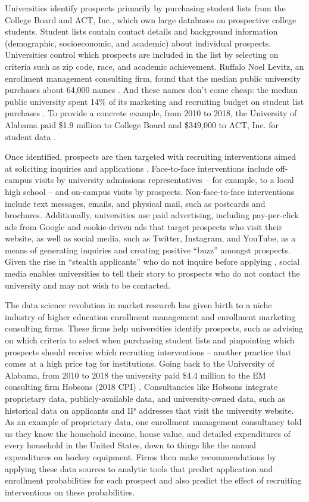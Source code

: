 \documentclass{article}
\begin{document}
Universities identify prospects primarily by purchasing student lists from the College Board and ACT, Inc., which own large databases on prospective college students. Student lists contain contact details and background information (demographic, socioeconomic, and academic) about individual prospects. Universities control which prospects are included in the list by selecting on criteria such as zip code, race, and academic achievement. Ruffalo Noel Levitz, an enrollment management consulting firm, found that the median public university purchases about 64,000 names \citep{RN4314}. And these names don't come cheap: the median public university spent 14\% of its marketing and recruiting budget on student list purchases \citep{RN4402}. To provide a concrete example, from 2010 to 2018, the University of Alabama paid \$1.9 million to College Board and \$349,000 to ACT, Inc. for student data \citep{RN4035}.

Once identified, prospects are then targeted with recruiting interventions aimed at soliciting inquiries and applications \citep{RN4323, RN4402}. Face-to-face interventions include off-campus visits by university admissions representatives -- for example, to a local high school -- and on-campus visits by prospects. Non-face-to-face interventions include text messages, emails, and physical mail, such as postcards and brochures. Additionally, universities use paid advertising, including pay-per-click ads from Google and cookie-driven ads that target prospects who visit their website, as well as social media, such as Twitter, Instagram, and YouTube, as a means of generating inquiries and creating positive ``buzz'' amongst prospects. Given the rise in ``stealth applicants'' who do not inquire before applying \citep{RN4411}, social media enables universities to tell their story to prospects who do not contact the university and may not wish to be contacted.

The data science revolution in market research has given birth to a niche industry of higher education enrollment management and enrollment marketing consulting firms. These firms help universities identify prospects, such as advising on which criteria to select when purchasing student lists and pinpointing which prospects should receive which recruiting interventions -- another practice that comes at a high price tag for institutions. Going back to the University of Alabama, from 2010 to 2018 the university paid \$4.4 million to the EM consulting firm Hobsons (2018 CPI) \citep{RN4035}. Consultancies like Hobsons integrate proprietary data, publicly-available data, and university-owned data, such as historical data on applicants and IP addresses that visit the university website. As an example of proprietary data, one enrollment management consultancy told us they know the household income, house value, and detailed expenditures of every household in the United States, down to things like the annual expenditures on hockey equipment. Firms then make recommendations by applying these data sources to analytic tools that predict application and enrollment probabilities for each prospect and also predict the effect of recruiting interventions on these probabilities.
\end{document}
